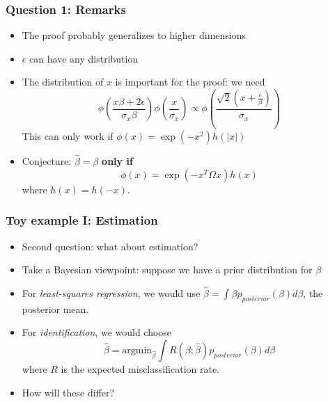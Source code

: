 \documentclass{beamer}
\newcommand{\argmin}{\text{argmin}}
\begin{document}
\begin{frame}
\frametitle{Question 1: Remarks}
\begin{itemize}
\item The proof probably generalizes to higher dimensions
\item $\epsilon$ can have any distribution
\item The distribution of $x$ is important for the proof: we need
\[
\phi\left(\frac{x\beta + 2\epsilon}{\sigma_x \beta}\right)
\phi\left(\frac{x}{\sigma_x}\right) \propto 
\phi\left(\frac{\sqrt{2} (x + \frac{\epsilon}{\beta})}{\sigma_x}\right)
\]
This can only work if $\phi(x) = \exp(-x^2)h(|x|)$
\item Conjecture: $\hat{\beta} = \beta$ \textbf{only if}
\[
\phi(x) = \exp(-x^T \Omega x) h(x)
\]
where $h(x) = h(-x)$.
\end{itemize}
\end{frame}

\begin{frame}
\frametitle{Toy example I: Estimation}
\begin{itemize}
\item Second question: what about estimation?
\item Take a Bayesian viewpoint: suppose we have a prior distribution for $\beta$
\item For \emph{least-squares regression}, we would use $\hat{\beta} = \int \beta p_{posterior}(\beta) d\beta$, the posterior mean.
\item For \emph{identification}, we would choose
\[
\hat{\beta} = \argmin_{\hat{\beta}} \int R(\beta; \hat{\beta}) p_{posterior}(\beta) d\beta
\]
where $R$ is the expected misclassification rate.
\item How will these differ?
\end{itemize}
\end{frame}
\end{document}
